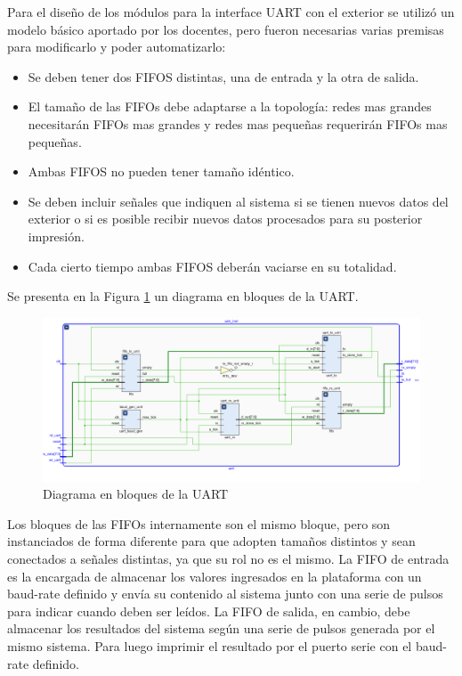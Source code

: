 	Para el diseño de los módulos para la interface UART con el exterior se utilizó un modelo básico aportado por los docentes, pero fueron necesarias varias premisas para modificarlo y poder automatizarlo:
	
	\begin{itemize}
		\item Se deben tener dos FIFOS distintas, una de entrada y la otra de salida.
		\item El tamaño de las FIFOs debe adaptarse a la topología: redes mas grandes necesitarán FIFOs mas grandes y redes mas pequeñas requerirán FIFOs mas pequeñas.
		\item Ambas FIFOS no pueden tener tamaño idéntico.
		\item Se deben incluir señales que indiquen al sistema si se tienen nuevos datos del exterior o si es posible recibir nuevos datos procesados para su posterior impresión.
		\item Cada cierto tiempo ambas FIFOS deberán vaciarse en su totalidad.		
	\end{itemize}
	
		Se presenta en la Figura \ref{fig:FSMD_UART} un diagrama en bloques de la UART.
			
		\begin{figure}[h]
		\centering
		\includegraphics[scale=.35]{./Figures/UART}
			\caption{Diagrama en bloques de la UART}
			\label{fig:FSMD_UART}
		\end{figure}

		Los bloques de las FIFOs internamente son el mismo bloque, pero son instanciados de forma diferente para que adopten tamaños distintos y sean conectados a señales distintas, ya que su rol no es el mismo. La FIFO de entrada es la encargada de almacenar los valores ingresados en la plataforma con un baud-rate definido y envía su contenido al sistema junto con una serie de pulsos para indicar cuando deben ser leídos. La FIFO de salida, en cambio, debe almacenar los resultados del sistema según una serie de pulsos generada por el mismo sistema. Para luego imprimir el resultado por el puerto serie con el baud-rate definido.

